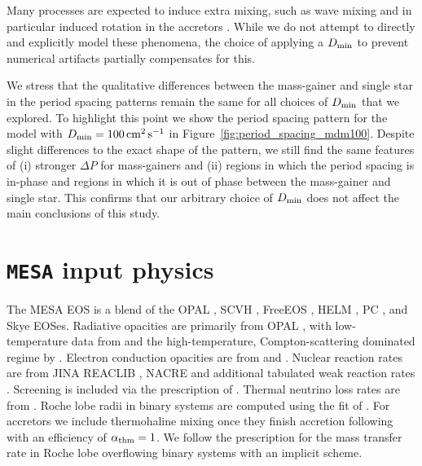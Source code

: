 \documentclass[desactivate]{aa}
\begin{document}
Many processes are expected to induce extra mixing, such as wave mixing and in particular induced rotation in the accretors \citep{Packet+1981}. While we do not attempt to directly and explicitly model these phenomena, the choice of applying a $D_{\rm min}$ to prevent numerical artifacts partially compensates for this.

We stress that the qualitative differences between the mass-gainer and single star in the period spacing patterns remain the same for all choices of $D_{\rm min}$ that we explored. To highlight this point we show the period spacing pattern for the model with $D_{\rm min} = 100 \,{\rm cm^2 \, s^{-1}}$ in Figure~\ref{fig:period_spacing_mdm100}. Despite slight differences to the exact shape of the pattern, we still find the same features of (i) stronger $\Delta P$ for mass-gainers and (ii) regions in which the period spacing is in-phase and regions in which it is out of phase between the mass-gainer and single star. This confirms that our arbitrary choice of $D_{\rm min}$ does not affect the main conclusions of this study.

\newpage

\section{\texttt{MESA} input physics}\label{app:mesa_inputs}

The MESA EOS is a blend of the OPAL \citep{Rogers2002}, SCVH
\citep{Saumon1995}, FreeEOS \citep{Irwin2004}, HELM \citep{Timmes2000},
PC \citep{Potekhin2010}, and Skye \citep{Jermyn2021} EOSes. Radiative opacities are primarily from OPAL \citep{Iglesias1993, Iglesias1996}, with low-temperature data from \citet{Ferguson2005} and the high-temperature, Compton-scattering dominated regime by \citet{Poutanen2017}. Electron conduction opacities are from \citet{Cassisi2007} and \citet{Blouin2020}. Nuclear reaction rates are from JINA REACLIB \citep{Cyburt2010}, NACRE \citep{Angulo1999} and additional tabulated weak reaction rates \citet{Fuller1985, Oda1994, Langanke2000}.  Screening is included via the prescription of \citet{Chugunov2007}. Thermal neutrino loss rates are from \citet{Itoh1996}. Roche lobe radii in binary systems are computed using the fit of
\citet{Eggleton1983}. For accretors we include thermohaline mixing once they finish accretion following \citet{Kippenhahn+1980} with an efficiency of $\alpha_{\rm thm} = 1$. We follow the \citet{Kolb+1990} prescription for the mass transfer rate in Roche lobe overflowing binary systems with an implicit scheme.
\end{document}

